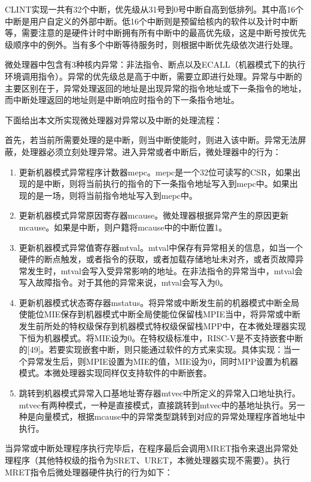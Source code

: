 CLINT实现一共有32个中断，优先级从31号到0号中断自高到低排列。其中高16个中断是用户自定义的外部中断。低16个中断则是预留给核内的软件以及计时中断等，需要注意的是硬件计时中断拥有所有中断中的最高优先级，这是中断号按优先级顺序中的例外。当有多个中断等待服务时，则根据中断优先级依次进行处理。

微处理器中包含有3种核内异常：非法指令、断点以及ECALL（机器模式下的执行环境调用指令）。异常的优先级总是高于中断，需要立即进行处理。异常与中断的主要区别在于，异常处理返回的地址是出现异常的指令地址或下一条指令的地址，而中断处理返回的地址则是中断响应时指令的下一条指令地址。

下面给出本文所实现微处理器对异常以及中断的处理流程：

首先，若当前所需要处理的是中断，则当中断使能时，则进入该中断。异常无法屏蔽，处理器必须立刻处理异常。进入异常或者中断后，微处理器中的行为：

\begin{enumerate}

\item 更新机器模式异常程序计数器mepc。mepc是一个32位可读写的CSR，如果出现的是中断，则将当前执行的指令的下一条指令地址写入到mepc中。如果出现的是一场，则将当前指令地址写入到mepc中。
\item 更新机器模式异常原因寄存器mcause。微处理器根据异常产生的原因更新mcause。如果是中断，则户籍将mcause中的中断位置1。
\item 更新机器模式异常值寄存器mtval。mtval中保存有异常相关的信息，如当一个硬件的断点触发，或者指令的获取，或者加载存储地址未对齐，或者页故障异常发生时，mtval会写入受异常影响的地址。在非法指令的异常当中，mtval会写入故障指令。对于其他的异常来说，mtval会写入为0。
\item 更新机器模式状态寄存器mstatus。将异常或中断发生前的机器模式中断全局使能位MIE保存到机器模式中断全局使能位保留栈MPIE当中，将异常或中断发生前所处的特权级保存到机器模式特权级保留栈MPP中，在本微处理器实现下恒为机器模式。将MIE设为0。在特权级标准中，RISC-V是不支持嵌套中断的[49]。若要实现嵌套中断，则只能通过软件的方式来实现。具体实现：当一个异常发生后，则MPIE设置为MIE的值，MIE设为0，同时MPP设置为机器模式。本微处理器实现同样仅支持软件的中断嵌套。
\item 跳转到机器模式异常入口基地址寄存器mtvec中所定义的异常入口地址执行。mtvec有两种模式，一种是直接模式，直接跳转到mtvec中的基地址执行。另一种是向量模式，根据mcause中的异常类型跳转到对应的异常处理程序首地址中执行。

\end{enumerate}

当异常或中断处理程序执行完毕后，在程序最后会调用MRET指令来退出异常处理程序（其他特权级的指令为SRET、URET，本微处理器实现不需要）。执行MRET指令后微处理器硬件执行的行为如下：


